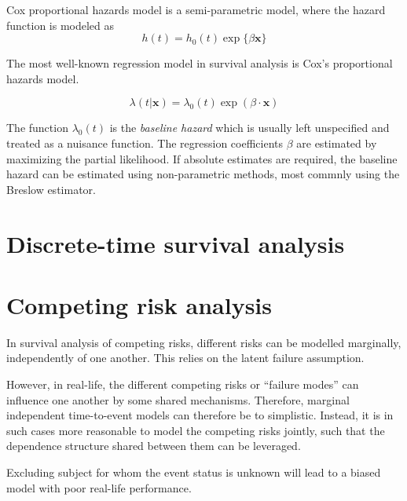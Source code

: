 Cox proportional hazards model is a semi-parametric model, 
where the hazard function is modeled as 
\begin{equation}
    h(t) = h_0(t) \exp \{\beta \mathbf{x}\}
\end{equation}


The most well-known regression model in survival analysis 
is Cox's proportional hazards model.

\begin{equation}
    \lambda (t | \mathbf{x}) = \lambda_0(t) \exp(\beta \cdot \mathbf{x})
\end{equation}

The function \(\lambda_0(t)\) is the \textit{baseline hazard} 
which is usually left unspecified and treated as a nuisance function.
The regression coefficients \(\beta\) are estimated
by maximizing the partial likelihood.
If absolute estimates are required, 
the baseline hazard can be estimated using non-parametric methods,
most commnly using the Breslow estimator.


\section{Discrete-time survival analysis}




\section{Competing risk analysis}




\autocite{biganzoliFeed1998}


In survival analysis of competing risks, 
different risks can be modelled marginally,
independently of one another.
This relies on the latent failure assumption.

However, in real-life, the different competing risks 
or \enquote{failure modes} can influence one another
by some shared mechanisms.
Therefore, marginal independent time-to-event models
can therefore be to simplistic.
Instead, it is in such cases
more reasonable to model the competing risks jointly,
such that the dependence structure shared between them
can be leveraged.

Excluding subject for whom the event status is unknown
will lead to a biased model with poor real-life performance.





